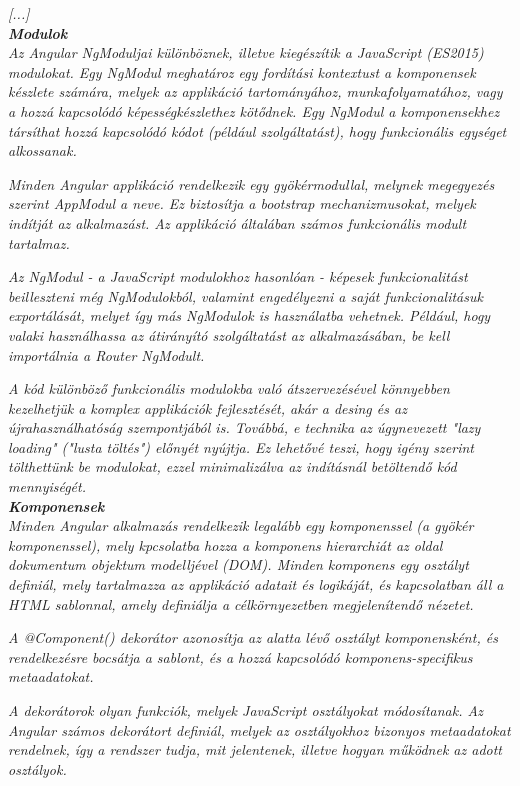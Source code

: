 \textit{[...]}\\

\noindent\textit{\textbf{Modulok}}\\

\textit{Az Angular NgModuljai különböznek, illetve kiegészítik a JavaScript (ES2015) modulokat. Egy NgModul meghatároz egy fordítási kontextust a komponensek készlete számára, melyek az applikáció tartományához, munkafolyamatához, vagy a hozzá kapcsolódó képességkészlethez kötődnek. Egy NgModul a komponensekhez társíthat hozzá kapcsolódó kódot (például szolgáltatást), hogy funkcionális egységet alkossanak.}

\textit{Minden Angular applikáció rendelkezik egy gyökérmodullal, melynek megegyezés szerint AppModul a neve. Ez biztosítja a bootstrap mechanizmusokat, melyek indítját az  alkalmazást. Az applikáció általában számos funkcionális modult tartalmaz.}

\textit{Az NgModul - a JavaScript modulokhoz hasonlóan - képesek funkcionalitást beilleszteni még NgModulokból, valamint engedélyezni a saját funkcionalitásuk exportálását, melyet így más NgModulok is használatba vehetnek. Például, hogy valaki használhassa az átirányító szolgáltatást az alkalmazásában, be kell importálnia a Router NgModult.}

\textit{A kód különböző funkcionális modulokba való átszervezésével könnyebben kezelhetjük a komplex applikációk fejlesztését, akár a desing és az újrahasználhatóság szempontjából is. Továbbá, e technika az úgynevezett "lazy loading" ("lusta töltés") előnyét nyújtja. Ez lehetővé teszi, hogy igény szerint tölthettünk be modulokat, ezzel minimalizálva az indításnál betöltendő kód mennyiségét.}\\

\noindent\textit{\textbf{Komponensek}}\\

\textit{Minden Angular alkalmazás rendelkezik legalább egy komponenssel (a gyökér komponenssel), mely kpcsolatba hozza a komponens hierarchiát az oldal dokumentum objektum modelljével (DOM). Minden komponens egy osztályt definiál, mely tartalmazza az applikáció adatait és logikáját, és kapcsolatban áll a HTML sablonnal, amely definiálja a célkörnyezetben megjelenítendő nézetet.}

\textit{A @Component() dekorátor azonosítja az alatta lévő osztályt komponensként, és rendelkezésre bocsátja a sablont, és a hozzá kapcsolódó komponens-specifikus metaadatokat.}

\textit{A dekorátorok olyan funkciók, melyek JavaScript osztályokat módosítanak. Az Angular számos dekorátort definiál, melyek az osztályokhoz bizonyos metaadatokat rendelnek, így a rendszer tudja, mit jelentenek, illetve hogyan működnek az adott osztályok.}

